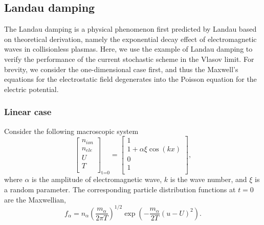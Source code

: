 \documentclass[preprint,3p,12pt,sort&compress]{elsarticle}
\begin{document}
\subsection{Landau damping}

The Landau damping is a physical phenomenon first predicted by Landau \cite{landau1946vibration} based on theoretical derivation, namely the exponential decay effect of electromagnetic waves in collisionless plasmas.
Here, we use the example of Landau damping to verify the performance of the current stochastic scheme in the Vlasov limit. 
For brevity, we consider the one-dimensional case first, 
and thus the Maxwell's equations for the electrostatic field degenerates into the Poisson equation for the electric potential.

\subsubsection{Linear case}

Consider the following macroscopic system
\begin{equation*}
\left[\begin{array}{c}
	n_{ion} \\
	n_{ele} \\
	U \\
	T \\
\end{array}\right]_{\text {t=0}}=\left[\begin{array}{c}
	1 \\
	1 + \alpha \xi \cos(kx) \\
	0 \\
	1 \\
\end{array}\right],
\end{equation*}
where $\alpha$ is the amplitude of electromagnetic wave, $k$ is the wave number, and $\xi$ is a random parameter.
The corresponding particle distribution functions at $t=0$ are the Maxwellian, 
\begin{equation*}
f_\alpha=n_\alpha \left(\frac{m_\alpha}{2\pi T}\right)^{1/2} \exp\left(-\frac{m_\alpha}{2 T} (u-U)^2\right).
\end{equation*}
\end{document}
